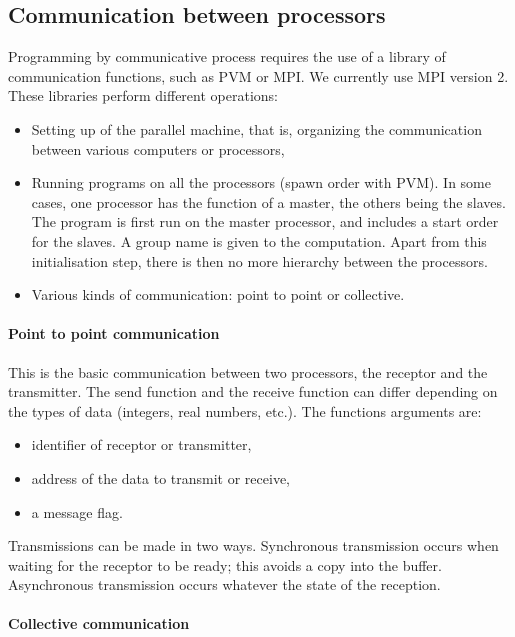 \subsection{Communication between processors}

Programming by communicative process requires the use of a library of
communication functions, such as PVM or MPI. We currently use MPI version 2.
These libraries perform different operations:
\begin{itemize}
  \item Setting up of the parallel machine, that is, organizing the
    communication between various computers or processors,
  \item Running programs on all the processors (spawn order with PVM).  In some
    cases, one processor has the function of a master, the others being the
    slaves. The program is first run on the master processor, and includes a
    start order for the slaves. A group name is given to the computation. Apart
    from this initialisation step, there is then no more hierarchy between the
    processors.
  \item Various kinds of communication: point to point or collective.
\end{itemize}

\paragraph{Point to point communication}

This is the basic communication between two processors, the receptor and the
transmitter. The send function and the receive function can differ depending on
the types of data (integers, real numbers, etc.). The functions arguments are:
\begin{itemize}
  \item identifier of receptor or transmitter,
  \item address of the data to transmit or receive,
  \item a message flag.
\end{itemize}
Transmissions can be made in two ways. Synchronous transmission occurs when
waiting for the receptor to be ready; this avoids a copy into the buffer.
Asynchronous transmission occurs whatever the state of the reception.

\paragraph{Collective communication}

